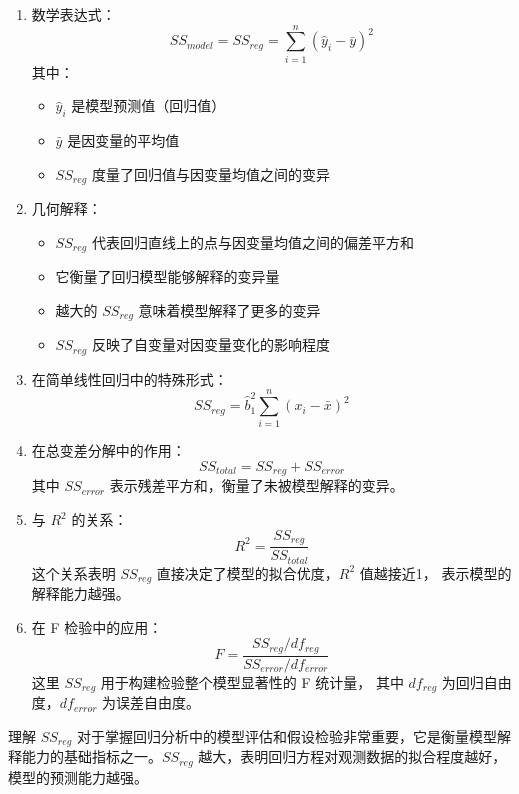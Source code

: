 \documentclass[UTF8]{report}
\theoremstyle{MyLineTheoremStyle} %
\theoremstyle{MyBlockTheoremStyle} %
\theoremstyle{MySubsubsectionStyle} %
\begin{document}
    \begin{enumerate}
       \item 数学表达式：
       \[
       SS_{model} = SS_{reg} = \sum_{i=1}^n (\hat{y}_i - \bar{y})^2
       \]
       其中：
       \begin{itemize}
           \item $\hat{y}_i$ 是模型预测值（回归值）
           \item $\bar{y}$ 是因变量的平均值
           \item $SS_{reg}$ 度量了回归值与因变量均值之间的变异
       \end{itemize}
    
       \item 几何解释：
       \begin{itemize}
           \item $SS_{reg}$ 代表回归直线上的点与因变量均值之间的偏差平方和
           \item 它衡量了回归模型能够解释的变异量
           \item 越大的 $SS_{reg}$ 意味着模型解释了更多的变异
           \item $SS_{reg}$ 反映了自变量对因变量变化的影响程度
       \end{itemize}
    
       \item 在简单线性回归中的特殊形式：
       \[
       SS_{reg} = \hat{b}_1^2\sum_{i=1}^n(x_i-\bar{x})^2
       \]
    
       \item 在总变差分解中的作用：
       \[
       SS_{total} = SS_{reg} + SS_{error}
       \]
       其中 $SS_{error}$ 表示残差平方和，衡量了未被模型解释的变异。
    
       \item 与 $R^2$ 的关系：
       \[
       R^2 = \frac{SS_{reg}}{SS_{total}}
       \]
       这个关系表明 $SS_{reg}$ 直接决定了模型的拟合优度，$R^2$ 值越接近1，
       表示模型的解释能力越强。
    
       \item 在 F 检验中的应用：
       \[
       F = \frac{SS_{reg}/df_{reg}}{SS_{error}/df_{error}}
       \]
       这里 $SS_{reg}$ 用于构建检验整个模型显著性的 F 统计量，
       其中 $df_{reg}$ 为回归自由度，$df_{error}$ 为误差自由度。
    \end{enumerate}


    理解 $SS_{reg}$ 对于掌握回归分析中的模型评估和假设检验非常重要，它是衡量模型解释能力的基础指标之一。$SS_{reg}$ 越大，表明回归方程对观测数据的拟合程度越好，模型的预测能力越强。
\end{document}
